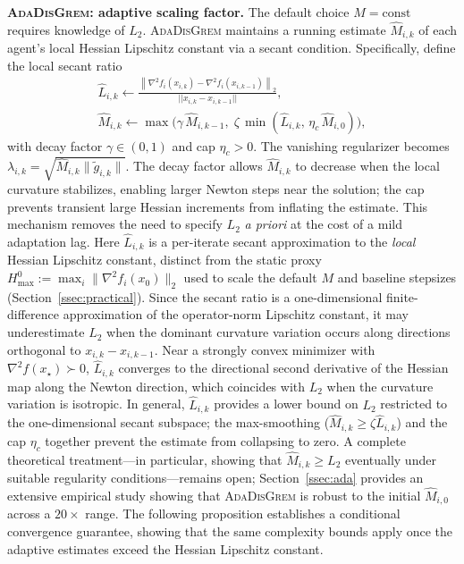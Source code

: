 \documentclass[11pt,a4paper]{article}
\def\norm#1{||#1||}%
\newcommand{\norm}[1]{\left\|#1\right\|}
\newcommand{\normtwo}[1]{\left\|#1\right\|_2}
\begin{document}
	\noindent\textbf{\textsc{AdaDisGrem}: adaptive scaling factor.}
	The default choice $M=\mathrm{const}$ requires knowledge of $L_2$.
	\textsc{AdaDisGrem} maintains a running estimate $\hat M_{i,k}$ of
	each agent's local Hessian Lipschitz constant via a secant condition.
	Specifically, define the local secant ratio
	\begin{gather*}
	\hat L_{i,k}\gets
	\frac{\normtwo{\nabla^2 f_i(x_{i,k})-\nabla^2 f_i(x_{i,k-1})}}
	     {\norm{x_{i,k}-x_{i,k-1}}},\\
	\hat M_{i,k}\gets \max\!\bigl(\gamma\,\hat M_{i,k-1},\;
	\zeta\,\min(\hat L_{i,k},\,\eta_c\,\hat M_{i,0})\bigr),
	\end{gather*}
	with decay factor $\gamma\in(0,1)$ and cap $\eta_c>0$.
	The vanishing regularizer becomes $\lambda_{i,k}=\sqrt{\hat M_{i,k}\|\tilde g_{i,k}\|}$.
	The decay factor allows $\hat M_{i,k}$ to decrease when the local
	curvature stabilizes, enabling larger Newton steps near the solution;
	the cap prevents transient large Hessian increments from inflating
	the estimate.
	This mechanism removes the need to specify $L_2$ \emph{a priori}
	at the cost of a mild adaptation lag.
	Here $\hat L_{i,k}$ is a per-iterate secant
	approximation to the \emph{local} Hessian Lipschitz constant,
	distinct from the static proxy
	$H_{\max}^0 := \max_i\|\nabla^2 f_i(x_0)\|_2$ used to
	scale the default $M$ and baseline stepsizes (Section~\ref{ssec:practical}).
	Since the secant ratio is a one-dimensional finite-difference
	approximation of the operator-norm Lipschitz constant, it may
	underestimate $L_2$ when the dominant curvature variation occurs
	along directions orthogonal to $x_{i,k}-x_{i,k-1}$.
	Near a strongly convex minimizer with $\nabla^2 f(x_\star)\succ 0$,
	$\hat L_{i,k}$ converges to the directional second
	derivative of the Hessian map along the Newton direction, which
	coincides with $L_2$ when the curvature variation is isotropic.
	In general, $\hat L_{i,k}$ provides a lower bound on $L_2$
	restricted to the one-dimensional secant subspace; the
	max-smoothing ($\hat M_{i,k}\ge\zeta\hat L_{i,k}$) and the cap
	$\eta_c$ together prevent the estimate from collapsing to zero.
	A complete theoretical treatment---in particular, showing that
	$\hat M_{i,k}\ge L_2$ eventually under suitable regularity
	conditions---remains open;
	Section~\ref{ssec:ada} provides an extensive empirical study
	showing that \textsc{AdaDisGrem} is robust to the initial
	$\hat M_{i,0}$ across a $20\times$ range.
	The following proposition establishes a conditional convergence
	guarantee, showing that the same complexity bounds apply once
	the adaptive estimates exceed the Hessian Lipschitz constant.
\end{document}
